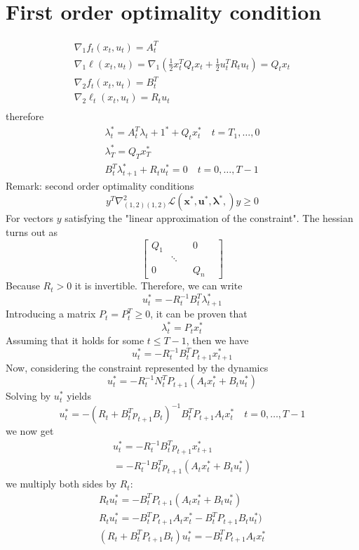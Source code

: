 \documentclass{book}
\theoremstyle{definition}
\theoremstyle{remark}
\theoremstyle{remark}
\begin{document}
\section{First order optimality condition}
\begin{gather*}
    \nabla_1f_t(x_t,u_t) = A_t^T\\
    \nabla_1\ell(x_t,u_t) = \nabla_1(\displaystyle\frac{1}{2}x_t^TQ_tx_t+\displaystyle\frac{1}{2}u_t^TR_tu_t)=Q_tx_t\\
    \nabla_2f_t(x_t,u_t) = B_t^T\\
    \nabla_2\ell_t(x_t,u_t) = R_tu_t\\
\end{gather*}
therefore 
\begin{gather*}
    \lambda_t^* = A_t^T\lambda_t+1^* + Q_tx_t^* \quad t= T_1,\dots,0\\
    \lambda_T^* = Q_Tx_T^* \\
    B_t^T\lambda_{t+1}^* + R_tu_t^* = 0 \quad t=0,\dots,T-1
\end{gather*}
Remark: second order optimality conditions 
\[
    y^T\nabla^2_{(1,2)(1,2)}\mathcal{L}(\mathbf{x}^*,\mathbf{u}^*,\mathbf{\lambda}^*,)y \geq 0
\]
For vectors $y$ satisfying the "linear approximation of the constraint". The hessian turns out as 
\[
    \begin{bmatrix}
        Q_1 & & &  0\\
            & \ddots & & & \\ 
        0 & & & Q_n
    \end{bmatrix}
\]
Because $R_t>0$ it is invertible. Therefore, we can write 
\[
    u_t^* = -R_t^{-1}B_t^T\lambda_{t+1}^*
\]
Introducing a matrix $P_t=P_t^T \geq 0$, it can be proven that 
\[
    \lambda_t^* = P_tx_t^*
\]
Assuming that it holds for some $t\leq T-1$, then we have 
\[
    u_t^* = -R_t^{-1}B_t^TP_{t+1}x_{t+1}^*
\]
Now, considering the constraint represented by the dynamics 
\[
    u_t^* = -R_t^{-1}N_t^TP_{t+1}(A_tx_t^*+B_tu_t^*)
\]
Solving by $u^*_t$ yields 
\[
    u_t^* = -(R_t+B_t^Tp_{t+1}B_t)^{-1}B_t^TP_{t+1}A_tx^*_t \quad t=0,\dots,T-1
\]
we now get 
\begin{gather*}
    u_t^* = -R_t^{-1}B_t^Tp_{t+1}x_{t+1}^* \\
    = -R_t^{-1}B_t^Tp_{t+1}(A_tx_t^*+B_tu_t^*)
\end{gather*}
we multiply both sides by $R_t$: 
\begin{gather*}
    R_tu_t^* = -B_t^TP_{t+1}(A_tx_t^*+B_tu_t^*)\\
    R_tu_t^* = -B_t^TP_{t+1}A_tx_t^*-B_t^TP_{t+1}B_tu_t^*)\\
    (R_t+B_t^TP_{t+1}B_t)u_t^* = -B_t^TP_{t+1}A_tx_t^*
\end{gather*}
\end{document}
